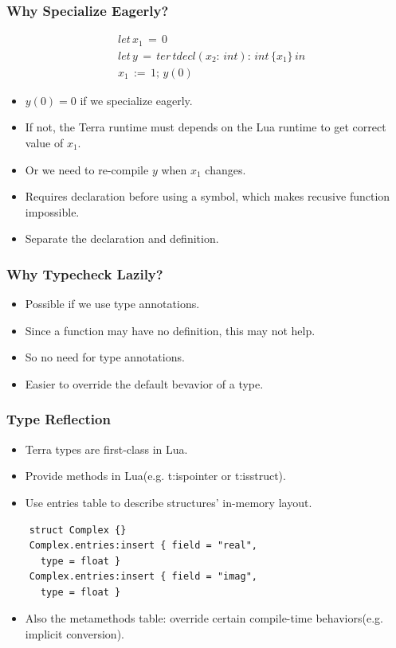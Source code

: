 \documentclass{beamer}
\begin{document}
\begin{frame}
	\frametitle{Why Specialize Eagerly?}
  \begin{equation*}
    \begin{split}
      & let \, x_1\, =\, 0 \\
      & let \, y\, =\, ter\, tdecl(x_2:\, int):\, int\, \{x_1\}\, in \\
      & x_1\, :=\, 1;\, y(0)
    \end{split}
  \end{equation*} \pause
  \newline
  \begin{itemize}
  \item $y(0) = 0$ if we specialize eagerly.\pause
  \item If not, the Terra runtime must depends on the Lua runtime to get correct value of $x_1$.\pause
  \item Or we need to re-compile $y$ when $x_1$ changes.\pause
  \item Requires declaration before using a symbol, which makes recusive function impossible.\pause
  \item Separate the declaration and definition.
  \end{itemize}
\end{frame}

\begin{frame}
	\frametitle{Why Typecheck Lazily?}
  \begin{itemize}
  \item Possible if we use type annotations.\pause
  \item Since a function may have no definition, this may not help.\pause
  \item So no need for type annotations.\pause
  \item Easier to override the default bevavior of a type.
  \end{itemize}
\end{frame}

\begin{frame}[fragile]
	\frametitle{Type Reflection}
  \begin{itemize}
  \item Terra types are first-class in Lua.\pause
  \item Provide methods in Lua(e.g. t:ispointer or t:isstruct).\pause
  \item Use entries table to describe structures' in-memory layout.
  \end{itemize}

  \begin{lstlisting}
    struct Complex {}
    Complex.entries:insert { field = "real",
      type = float }
    Complex.entries:insert { field = "imag",
      type = float }
\end{lstlisting}\pause

  \begin{itemize}
  \item Also the metamethods table: override certain compile-time behaviors(e.g. implicit conversion).
  \end{itemize}
\end{frame}
\end{document}
